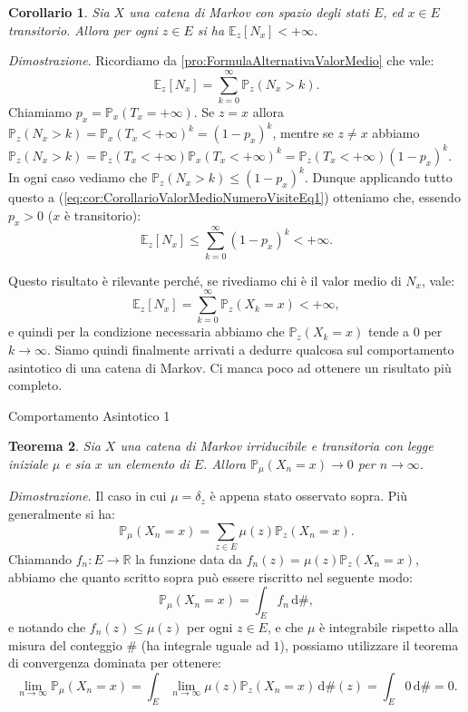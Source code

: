 \documentclass[11pt]{book}
\makeatletter
\theoremstyle{Definizione}
\theoremstyle{TeoremaProposizioneLemmaCorollario}
\newtheorem{myteo}{Teorema}[section]
\newtheorem{mycor}[myteo]{Corollario}
\theoremstyle{OsservazioneNota}
\renewenvironment{proof}[1][\proofname]{\par
  \normalfont \topsep6\p@\@plus6\p@\relax
  \trivlist
  \item[\hskip\labelsep
        \itshape
    #1\@addpunct{.}]\ignorespaces
}{%
  \endtrivlist\@endpefalse
}
\newcommand{\R}{\mathbb{R}}
\renewcommand{\P}{\mathbb{P}}
\renewcommand{\d}{\mathrm{d}}
\newcommand{\E}{\mathbb{E}}
\renewenvironment{proof}{\textsl{Dimostrazione}.}{}
\makeatother
\begin{document}
\begin{boxoss}
\begin{mycor}
Sia $X$ una catena di Markov con spazio degli stati $E$, ed $x\in E$ transitorio. Allora per ogni $z\in E$ si ha $\E_z[N_x] < +\infty$.
\end{mycor}
\tcblower
\begin{proof}
Ricordiamo da \ref{pro:FormulaAlternativaValorMedio} che vale:
\begin{equation}\label{eq:cor:CorollarioValorMedioNumeroVisiteEq1}
\E_z[N_x] = \sum_{k = 0}^\infty \P_z(N_x > k).
\end{equation}
Chiamiamo $p_x = \P_x(T_x = +\infty)$. Se $z = x$ allora $\P_z(N_x > k) = \P_x(T_x < +\infty)^k = (1-p_x)^k$, mentre se $z \neq x$ abbiamo $\P_z(N_x > k) = \P_z(T_x < +\infty)\P_x(T_x < +\infty)^k = \P_z(T_x < +\infty) (1-p_x)^k$. In ogni caso vediamo che $\P_z(N_x > k) \leq (1-p_x)^k$. Dunque applicando tutto questo a (\ref{eq:cor:CorollarioValorMedioNumeroVisiteEq1}) otteniamo che, essendo $p_x > 0$ ($x$ è transitorio):
$$
\E_z[N_x] \leq \sum_{k = 0}^\infty (1-p_x)^k < +\infty.
$$
\end{proof}
\end{boxoss}
\noindent
Questo risultato è rilevante perché, se rivediamo chi è il valor medio di $N_x$, vale:
$$
\E_z[N_x] = \sum_{k = 0}^\infty \P_z (X_k = x) < +\infty,
$$
e quindi per la condizione necessaria abbiamo che $\P_z(X_k = x)$ tende a $0$ per $k \to \infty$. Siamo quindi finalmente arrivati a dedurre qualcosa sul comportamento asintotico di una catena di Markov. Ci manca poco ad ottenere un risultato più completo.
\begin{boxteo}{Comportamento Asintotico 1}
\begin{myteo}
Sia $X$ una catena di Markov irriducibile e transitoria con legge iniziale $\mu$ e sia $x$ un elemento di $E$. Allora $\P_\mu(X_n = x) \to 0$ per $n \to \infty$.
\end{myteo}
\tcblower
\begin{proof}
Il caso in cui $\mu = \delta_z$ è appena stato osservato sopra. Più generalmente si ha:
$$
\P_\mu(X_n = x) = \sum_{z \in E} \mu(z)\P_z(X_n = x).
$$
Chiamando $f_n: E \longrightarrow \R$ la funzione data da $f_n(z) = \mu(z)\P_z(X_n = x)$, abbiamo che quanto scritto sopra può essere riscritto nel seguente modo:
$$
\P_\mu(X_n = x) = \int_E f_n\,\d \#,
$$
e notando che $f_n(z) \leq \mu(z)$ per ogni $z\in E$, e che $\mu$ è integrabile rispetto alla misura del conteggio $\#$ (ha integrale uguale ad $1$), possiamo utilizzare il teorema di convergenza dominata per ottenere:
$$
\lim_{n \to \infty} \P_\mu(X_n = x) = \int_E \lim_{n \to \infty} \mu(z)\P_z(X_n = x)\,\d \#(z) = \int_E 0 \,\d\# = 0.
$$
\end{proof}
\end{boxteo}
\end{document}
